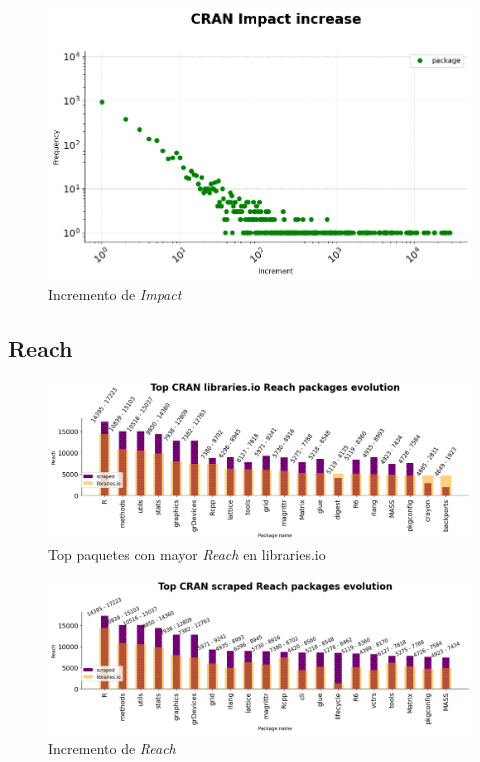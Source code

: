 \begin{figure}[h!]
    \begin{center}
        \includegraphics[width=1\textwidth]{img/cran/impact_increase_dist.png}
        \caption{Incremento de \textit{Impact}}
        \label{fig:Incremento de Impact}
    \end{center}
\end{figure}


\subsection{Reach}

\begin{figure}[h!]
    \begin{center}
        \includegraphics[width=1\textwidth]{img/cran/reach_top.png}
        \caption{Top paquetes con mayor \textit{Reach} en libraries.io}
        \label{fig:Top reach libraries.io}
    \end{center}
\end{figure}

\begin{figure}[h!]
    \begin{center}
        \includegraphics[width=1\textwidth]{img/cran/reach_top2.png}
        \caption{Incremento de \textit{Reach}}
        \label{fig:Top reach scraped}
    \end{center}
\end{figure}

